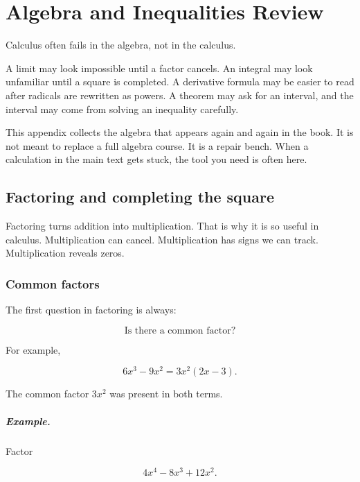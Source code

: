 
\appendix
\chapter{Algebra and Inequalities Review}
\label{app:algebra-inequalities-review}

Calculus often fails in the algebra, not in the calculus.

A limit may look impossible until a factor cancels.  An integral may look unfamiliar
until a square is completed.  A derivative formula may be easier to read after radicals
are rewritten as powers.  A theorem may ask for an interval, and the interval may come
from solving an inequality carefully.

This appendix collects the algebra that appears again and again in the book.  It is not
meant to replace a full algebra course.  It is a repair bench.  When a calculation in the
main text gets stuck, the tool you need is often here.

\section{Factoring and completing the square}
\label{appsec:factoring-completing-square}

Factoring turns addition into multiplication.  That is why it is so useful in calculus.
Multiplication can cancel.  Multiplication has signs we can track.  Multiplication reveals
zeros.

\subsection{Common factors}
\label{appsubsec:common-factors}

The first question in factoring is always:

\[
\text{Is there a common factor?}
\]

For example,

\[
6x^3-9x^2=3x^2(2x-3).
\]

The common factor \(3x^2\) was present in both terms.

\paragraph{Example.}
Factor

\[
4x^4-8x^3+12x^2.
\]

